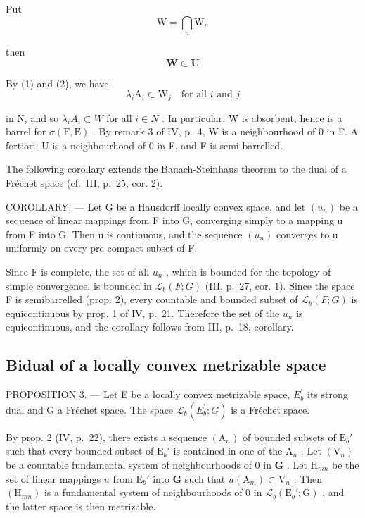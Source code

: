 Put
\[
\mathrm{W} = \bigcap_ {n} \mathrm{W} _ {n}
\]

then
\[
\mathbf {W} \subset \mathbf {U}
\]

By (1) and (2), we have
\[
\lambda_ {i} \mathrm{A} _ {i} \subset \mathrm{W} _ {j} \quad \text {for all } i \text { and } j
\]

in N, and so \(\lambda_{i}A_{i}\subset W\) for all \(i\in N\) . In particular, W is absorbent, hence is a barrel for \(\sigma(\mathrm{F},\mathrm{E})\) . By remark 3 of IV, p.~4, W is a neighbourhood of 0 in F. A fortiori, U is a neighbourhood of 0 in F, and F is semi-barrelled.

The following corollary extends the Banach-Steinhaus theorem to the dual of a Fréchet space (cf.~III, p.~25, cor. 2).

COROLLARY. --- Let G be a Hausdorff locally convex space, and let \((u_{n})\) be a sequence of linear mappings from F into G, converging simply to a mapping u from F into G. Then u is continuous, and the sequence \((u_{n})\) converges to u uniformly on every pre-compact subset of F.

Since F is complete, the set of all \(u_{n}\) , which is bounded for the topology of simple convergence, is bounded in \(\mathcal{L}_{b}(F;G)\) (III, p.~27, cor. 1). Since the space F is semibarrelled (prop. 2), every countable and bounded subset of \(\mathcal{L}_{b}(F;G)\) is equicontinuous by prop. 1 of IV, p.~21. Therefore the set of the \(u_{n}\) is equicontinuous, and the corollary follows from III, p.~18, corollary.

\subsection{Bidual of a locally convex metrizable space}

PROPOSITION 3. --- Let E be a locally convex metrizable space, \(E_{b}^{\prime}\) its strong dual and G a Fréchet space. The space \(\mathcal{L}_{b}(E_{b}^{\prime}; G)\) is a Fréchet space.

By prop. 2 (IV, p.~22), there exists a sequence \((\mathrm{A}_n)\) of bounded subsets of \(\mathrm{E}_b'\) such that every bounded subset of \(\mathrm{E}_b'\) is contained in one of the \(\mathrm{A}_n\) . Let \((\mathrm{V}_n)\) be a countable fundamental system of neighbourhoods of 0 in \(\mathbf{G}\) . Let \(\mathrm{H}_{mn}\) be the set of linear mappings \(u\) from \(\mathrm{E}_b'\) into \(\mathbf{G}\) such that \(u(\mathrm{A}_m) \subset \mathrm{V}_n\) . Then \((\mathrm{H}_{mn})\) is a fundamental system of neighbourhoods of 0 in \(\mathcal{L}_b(\mathrm{E}_b'; \mathrm{G})\) , and the latter space is then metrizable.


